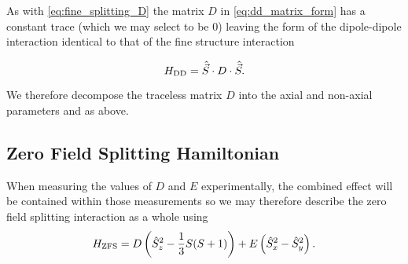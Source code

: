 As with \eqref{eq:fine_splitting_D} the matrix $D$ in \eqref{eq:dd_matrix_form} has a constant trace (which we may select to be $0$) leaving the form of the dipole-dipole interaction identical to that of the fine structure interaction 

\begin{equation}
    H_{\ce{DD}} = \hat{\vec{S}} \cdot D \cdot \hat{\vec{S}}.
\end{equation}

We therefore decompose the traceless matrix $D$ into the axial and non-axial parameters  and  as above. 


\subsection{Zero Field Splitting Hamiltonian}
When measuring the values of $D$ and $E$ experimentally, the combined effect will be contained within those measurements so we may therefore describe the zero field splitting interaction as a whole using 
\begin{equation}
    H_{\ce{ZFS}} =D \left(\hat{S}_z^2 - \frac{1}{3}S(S+1)\right) + E\left(\hat{S}_x^2 - \hat{S}_y^2\right).
    \label{eq:ZFS_hamiltonian}
\end{equation}


